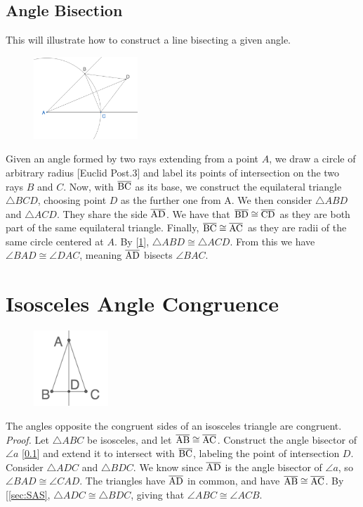 \documentclass{report}
\begin{document}
\subsection{Angle Bisection}
\label{sec:angleBisect}
This will illustrate how to construct a line bisecting a given angle.
\\[\baselineskip]
\begin{figure} %
    \centering
    \includegraphics[width=0.35\textwidth]{angbisector}
\end{figure}
Given an angle formed by two rays extending from a point $A$, we draw a circle of arbitrary radius [Euclid Post.\@ 3] and label its points of intersection on the two rays $B$ and $C$. Now, with $\overline{\rm BC}$ as its base, we construct the equilateral triangle $\triangle{BCD}$, choosing point $D$ as the further one from A. We then consider $\triangle{ABD}$ and $\triangle{ACD}$. They share the side $\overline{\rm AD}$. We have that $\overline{\rm BD} \cong \overline{\rm CD}$ as they are both part of the same equilateral triangle. Finally, $\overline{\rm BC} \cong \overline{\rm AC}$ as they are radii of the same circle centered at $A$. By [\ref{sec:isoAngleCong}], $\triangle{ABD} \cong\triangle{ACD}$. From this we have $\angle BAD \cong \angle DAC$, meaning $\overline{\rm AD}$ bisects $\angle BAC$.
\section{Isosceles Angle Congruence}
\label{sec:isoAngleCong}
\begin{figure} %
    \centering
    \includegraphics[width=0.25\textwidth]{ISOC}
\end{figure}
The angles opposite the congruent sides of an isosceles triangle are congruent.
\\[\baselineskip]
\textit{Proof.} Let $\triangle{ABC}$ be isosceles, and let $\overline{\rm AB} \cong \overline{\rm AC}$. Construct the angle bisector of $\angle a$ [\ref{sec:angleBisect}] and extend it to intersect with $\overline{\rm BC}$, labeling the point of intersection $D$. Consider $\triangle{ADC}$ and $\triangle{BDC}$. We know since $\overline{\rm AD}$ is the angle bisector of $\angle a$, so $\angle BAD \cong \angle CAD$. The triangles have $\overline{\rm AD}$ in common, and have $\overline{\rm AB} \cong \overline{\rm AC}$. By [\ref{sec:SAS}, $\triangle{ADC} \cong \triangle{BDC}$, giving that $\angle ABC \cong \angle ACB$.
\end{document}
